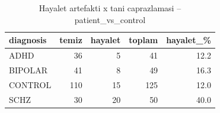 \begin{table}[htbp]
  \centering
  \caption{Hayalet artefakti x tani caprazlamasi -- patient\_vs\_control}
  \label{tab:ghost_patient_vs_control}
  \small
  \begin{tabular}{lrrrr}
    \toprule
    diagnosis & temiz & hayalet & toplam & hayalet\_\% \\
    \midrule
    ADHD & 36 & 5 & 41 & 12.2 \\
    BIPOLAR & 41 & 8 & 49 & 16.3 \\
    CONTROL & 110 & 15 & 125 & 12.0 \\
    SCHZ & 30 & 20 & 50 & 40.0 \\
    \bottomrule
  \end{tabular}
\end{table}
